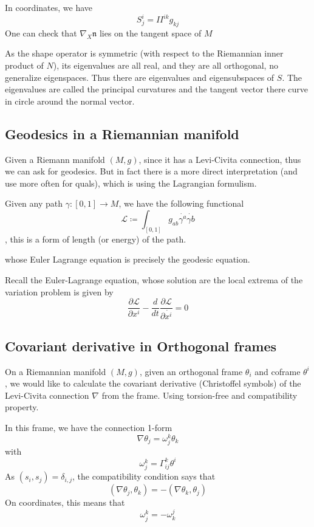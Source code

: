 \documentclass[main.tex]{subfiles}
\begin{document}
In coordinates, we have 
$$
S^i _j =  II^{ik} g_{kj}
$$
One can check that $\nabla_{X} \mathfrak{n}$ lies on the tangent space of $M$

As the shape operator is symmetric (with respect to the Riemannian inner product of $N$), its eigenvalues are all real, and they are all orthogonal, no generalize eigenspaces. Thus there are eigenvalues and eigensubspaces of $S$. The eigenvalues are called the principal curvatures and the tangent vector there curve in circle around the normal vector.

\subsection{Geodesics in a Riemannian manifold}
Given a Riemann manifold $(M, g)$, since it has a Levi-Civita connection, thus we can ask for geodesics. But in fact there is a more direct interpretation (and use more often for quals), which is using the Lagrangian formulism.

Given any path $\gamma: [0,1] \rightarrow M$, we have the following functional 
$$
\mathcal{L} \coloneqq \int_{[0,1]} g_{ab} \dot{\gamma^a} \dot{\gamma b}
$$, this is a form of length (or energy) of the path.

whose Euler Lagrange equation is precisely the geodesic equation. 

Recall the Euler-Lagrange equation, whose solution are the local extrema of the variation problem is given by 
$$
\frac{\partial \mathcal{L}}{\partial x^i} - \frac{d}{dt} \frac{\partial \mathcal{L}}{\partial \dot{x^i}} = 0
$$

\subsection{Covariant derivative in Orthogonal frames}

On a Riemannian manifold $(M, g)$, given an orthogonal frame $\theta_i$ and coframe $\theta^i$, we would like to calculate the covariant derivative (Christoffel symbols) of the Levi-Civita connection $\nabla$ from the frame. Using torsion-free and compatibility property.


In this frame, we have the connection 1-form 
$$
\nabla \theta_j = \omega_j ^k \theta_k
$$
with 
$$
\omega_j ^k = \Gamma_{ij}^k \theta^i
$$
As $(s_i, s_j) = \delta_{i,j}$, the compatibility condition says that 
$$
(\nabla \theta_j, \theta_k) = -(\nabla \theta_k, \theta_j)
$$
On coordinates, this means that 
$$
\omega_j ^k = - \omega_k ^j
$$
\end{document}

